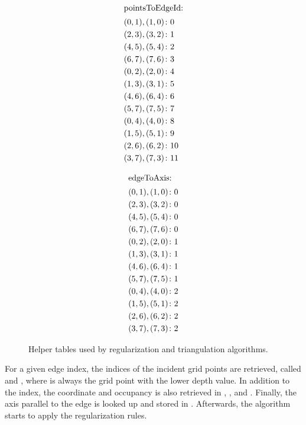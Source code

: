 \begin{figure}
\begin{subfigure}[t]{0.24\textwidth}
\begin{align*}
		\end{align*}
	\end{subfigure}
	\begin{subfigure}[t]{0.24\textwidth}
		\centering
		\begin{align*}
			\shortintertext{pointsToEdgeId:}
			(0, 1), (1, 0) &\colon  0 \\
			(2, 3), (3, 2) &\colon  1 \\
			(4, 5), (5, 4) &\colon  2 \\
			(6, 7), (7, 6) &\colon  3 \\
			(0, 2), (2, 0) &\colon  4 \\
			(1, 3), (3, 1) &\colon  5 \\
			(4, 6), (6, 4) &\colon  6 \\
			(5, 7), (7, 5) &\colon  7 \\
			(0, 4), (4, 0) &\colon  8 \\
			(1, 5), (5, 1) &\colon  9 \\
			(2, 6), (6, 2) &\colon 10 \\
			(3, 7), (7, 3) &\colon 11
		\end{align*}
	\end{subfigure}
	\begin{subfigure}[t]{0.24\textwidth}
		\centering
		\begin{align*}
			\shortintertext{edgeToAxis:}
			(0, 1), (1, 0) &\colon 0 \\
			(2, 3), (3, 2) &\colon 0 \\
			(4, 5), (5, 4) &\colon 0 \\
			(6, 7), (7, 6) &\colon 0 \\
			(0, 2), (2, 0) &\colon 1 \\
			(1, 3), (3, 1) &\colon 1 \\
			(4, 6), (6, 4) &\colon 1 \\
			(5, 7), (7, 5) &\colon 1 \\
			(0, 4), (4, 0) &\colon 2 \\
			(1, 5), (5, 1) &\colon 2 \\
			(2, 6), (6, 2) &\colon 2 \\
			(3, 7), (7, 3) &\colon 2
		\end{align*}
	\end{subfigure}
	\caption{
		Helper tables used by regularization and triangulation algorithms.
	}
	\label{fig:tri_dexel_tables}
\end{figure}
%
For a given edge index, the indices of the incident grid points are retrieved, called  and , where  is always the grid point with the lower depth value.
In addition to the index, the coordinate and occupancy is also retrieved in , ,  and .
Finally, the axis parallel to the edge is looked up and stored in .
Afterwards, the algorithm starts to apply the regularization rules.

